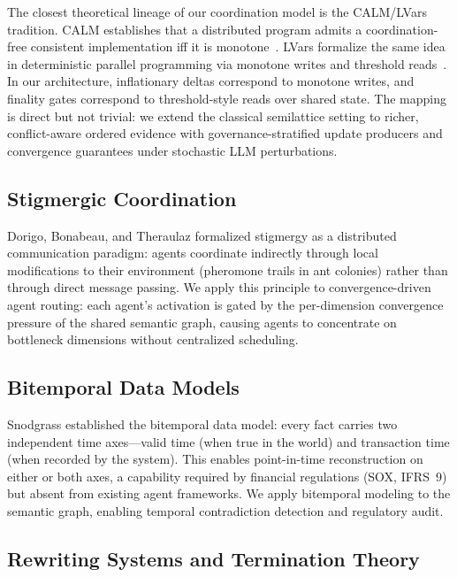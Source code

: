 \documentclass[11pt]{article}
\begin{document}
The closest theoretical lineage of our coordination model is the CALM/LVars tradition. CALM establishes that a distributed program admits a coordination-free consistent implementation iff it is monotone~\cite{hellerstein2019calm,ameloot2025calm}. LVars formalize the same idea in deterministic parallel programming via monotone writes and threshold reads~\cite{kuper2013lvars}. In our architecture, inflationary deltas correspond to monotone writes, and finality gates correspond to threshold-style reads over shared state. The mapping is direct but not trivial: we extend the classical semilattice setting to richer, conflict-aware ordered evidence with governance-stratified update producers and convergence guarantees under stochastic LLM perturbations.

\subsection{Stigmergic Coordination}

Dorigo, Bonabeau, and Theraulaz \cite{dorigo2000} formalized stigmergy as a distributed communication paradigm: agents coordinate indirectly through local modifications to their environment (pheromone trails in ant colonies) rather than through direct message passing. We apply this principle to convergence-driven agent routing: each agent's activation is gated by the per-dimension convergence pressure of the shared semantic graph, causing agents to concentrate on bottleneck dimensions without centralized scheduling.

\subsection{Bitemporal Data Models}

Snodgrass \cite{snodgrass2000} established the bitemporal data model: every fact carries two independent time axes---valid time (when true in the world) and transaction time (when recorded by the system). This enables point-in-time reconstruction on either or both axes, a capability required by financial regulations (SOX, IFRS~9) but absent from existing agent frameworks. We apply bitemporal modeling to the semantic graph, enabling temporal contradiction detection and regulatory audit.

\subsection{Rewriting Systems and Termination Theory}
\end{document}
